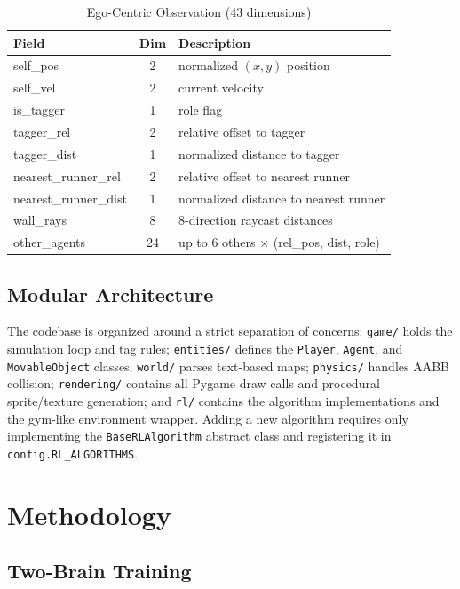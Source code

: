 \documentclass[conference]{IEEEtran}
\begin{document}
\begin{table}[t]
\caption{Ego-Centric Observation (43 dimensions)}
\label{tab:obs}
\centering
\begin{tabular}{lcl}
\toprule
\textbf{Field} & \textbf{Dim} & \textbf{Description} \\
\midrule
self\_pos              & 2  & normalized $(x, y)$ position \\
self\_vel              & 2  & current velocity \\
is\_tagger             & 1  & role flag \\
tagger\_rel            & 2  & relative offset to tagger \\
tagger\_dist           & 1  & normalized distance to tagger \\
nearest\_runner\_rel   & 2  & relative offset to nearest runner \\
nearest\_runner\_dist  & 1  & normalized distance to nearest runner \\
wall\_rays             & 8  & 8-direction raycast distances \\
other\_agents          & 24 & up to 6 others $\times$ (rel\_pos, dist, role) \\
\bottomrule
\end{tabular}
\end{table}

\subsection{Modular Architecture}

The codebase is organized around a strict separation of concerns: \texttt{game/}
holds the simulation loop and tag rules; \texttt{entities/} defines the
\texttt{Player}, \texttt{Agent}, and \texttt{MovableObject} classes;
\texttt{world/} parses text-based maps; \texttt{physics/} handles AABB collision;
\texttt{rendering/} contains all Pygame draw calls and procedural sprite/texture
generation; and \texttt{rl/} contains the algorithm implementations and the
gym-like environment wrapper. Adding a new algorithm requires only
implementing the \texttt{BaseRLAlgorithm} abstract class and registering it in
\texttt{config.RL\_ALGORITHMS}.

\section{Methodology}
\subsection{Two-Brain Training}\label{sec:dualrole}
\end{document}
